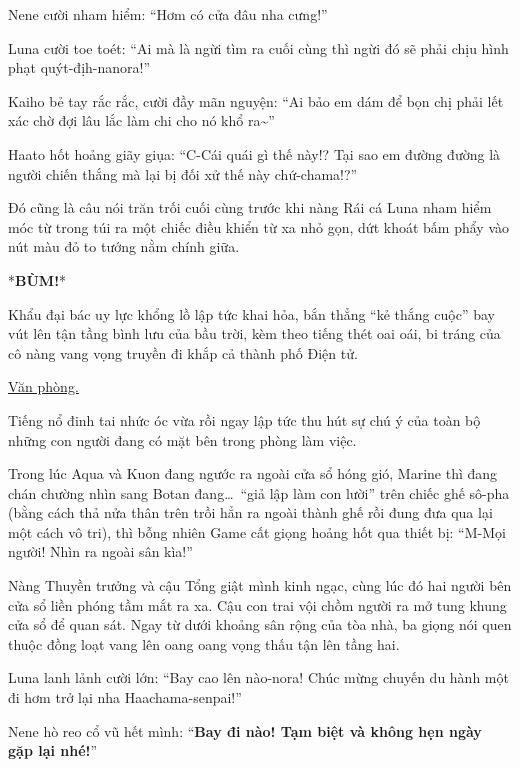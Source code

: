 \documentclass[../main.tex]{subfiles}
\begin{document}

Nene cười nham hiểm: ``Hơm có cửa đâu nha cưng!''

Luna cười toe toét: ``Ai mà là ngừi tìm ra cuối cùng thì ngừi đó sẽ phải chịu hình phạt quýt-địh-nanora!''

Kaiho bẻ tay rắc rắc, cười đầy mãn nguyện: ``Ai bảo em dám để bọn chị phải lết xác chờ đợi lâu lắc làm chi cho nó khổ ra\~{}''

Haato hốt hoảng giãy giụa: ``C-Cái quái gì thế này!? Tại sao em đường đường là người chiến thắng mà lại bị đối xử thế này chứ-chama!?''

Đó cũng là câu nói trăn trối cuối cùng trước khi nàng Rái cá Luna nham hiểm móc từ trong túi ra một chiếc điều khiển từ xa nhỏ gọn, dứt khoát bấm phẩy vào nút màu đỏ to tướng nằm chính giữa.

*\textbf{BÙM!}*

Khẩu đại bác uy lực khổng lồ lập tức khai hỏa, bắn thẳng ``kẻ thắng cuộc'' bay vút lên tận tầng bình lưu của bầu trời, kèm theo tiếng thét oai oái, bi tráng của cô nàng vang vọng truyền đi khắp cả thành phố Điện tử.

\begin{center}
    \uline{Văn phòng.}
\end{center}

Tiếng nổ đinh tai nhức óc vừa rồi ngay lập tức thu hút sự chú ý của toàn bộ những con người đang có mặt bên trong phòng làm việc.

Trong lúc Aqua và Kuon đang ngước ra ngoài cửa sổ hóng gió, Marine thì đang chán chường nhìn sang Botan đang\dots\ ``giả lập làm con lười'' trên chiếc ghế sô-pha (bằng cách thả nửa thân trên trồi hẳn ra ngoài thành ghế rồi đung đưa qua lại một cách vô tri), thì bỗng nhiên Game cất giọng hoảng hốt qua thiết bị: ``M-Mọi người! Nhìn ra ngoài sân kìa!''


Nàng Thuyền trưởng và cậu Tổng giật mình kinh ngạc, cùng lúc đó hai người bên cửa sổ liền phóng tầm mắt ra xa. Cậu con trai vội chồm người ra mở tung khung cửa sổ để quan sát. Ngay từ dưới khoảng sân rộng của tòa nhà, ba giọng nói quen thuộc đồng loạt vang lên oang oang vọng thấu tận lên tầng hai.

Luna lanh lảnh cười lớn: ``Bay cao lên nào-nora! Chúc mừng chuyến du hành một đi hơm trở lại nha Haachama-senpai!''

Nene hò reo cổ vũ hết mình: ``\textbf{Bay đi nào! Tạm biệt và không hẹn ngày gặp lại nhé!}''
\end{document}
